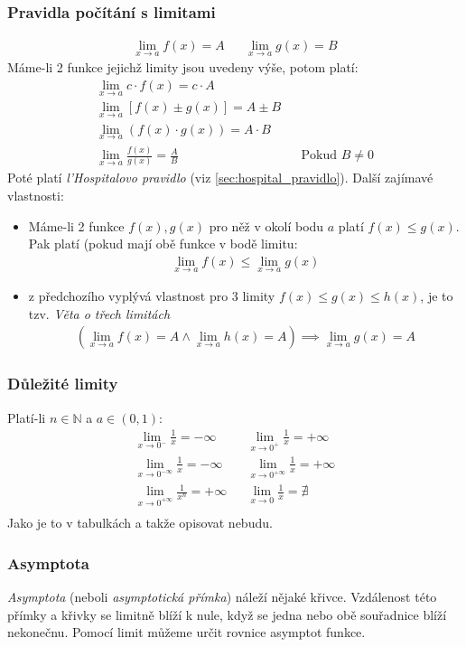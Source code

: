 \documentclass[12pt]{article}
\newcommand{\nN}{\mathbb{N}} %
\begin{document}
\subsubsection{Pravidla počítání s limitami}
\begin{align}
 \lim _{x\to a} f(x) = A &&  \lim _{x\to a} g(x) = B
\end{align}
Máme-li 2 funkce jejichž limity jsou uvedeny výše, potom platí:
\begin{align}
 \lim _{x\to a}c \cdot f(x)=c \cdot A\\
 \lim _{x\to a}[f(x)\pm g(x)]=A\pm B\\
 \lim _{x\to a}\left( f(x) \cdot g(x) \right)=A \cdot B\\
\lim _{x\to a}{\frac {f(x)}{g(x)}}={\frac {A}{B}} && \text{Pokud $B \neq 0$}
\end{align}
Poté platí \emph{l'Hospitalovo pravidlo} (viz \ref{sec:hospital_pravidlo}). Další zajímavé vlastnosti:
\begin{itemize}
\item Máme-li 2 funkce $f(x),g(x)$ pro něž v okolí bodu $a$ platí $f(x) \leq g(x)$. Pak platí (pokud mají obě funkce v bodě limitu:
\begin{align}
\lim _{x\to a}f(x)\leq \lim _{x\to a}g(x)
\end{align}
\item z předchozího vyplývá vlastnost pro 3 limity $ f(x)\leq g(x)\leq h(x)$, je to tzv. \emph{Věta o třech limitách}
\begin{align}
\left(  \lim _{x\to a}f(x)=A \land \lim _{x\to a}h(x)=A \right) \implies  \lim _{x\to a}g(x)=A
\end{align}
\end{itemize}
\subsubsection{Důležité limity}
Platí-li $n \in \nN$ a $a \in (0,1)$:
\begin{align}
\lim_{x \to 0^-} \frac{1}{x} = - \infty && \lim_{x \to 0^+} \frac{1}{x} = + \infty \\
\lim_{x \to 0^{-\infty}} \frac{1}{x} = - \infty && \lim_{x \to 0^{+ \infty}} \frac{1}{x} = + \infty \\
\lim_{x \to 0^{+ \infty}} \frac{1}{x^n} = + \infty && \lim_{x \to 0} \frac{1}{x} = \nexists\\
\end{align}
Jako je to v tabulkách a takže opisovat nebudu.
\subsubsection{Asymptota}
\emph{Asymptota} (neboli \emph{asymptotická přímka}) náleží nějaké křivce.  Vzdálenost této přímky a křivky se limitně blíží k nule, když se jedna nebo obě souřadnice blíží nekonečnu. Pomocí limit můžeme určit rovnice asymptot funkce. \\
\end{document}
